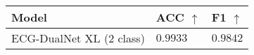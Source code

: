 \begin{tabular}{>{\raggedright\arraybackslash}p{}>{\raggedright\arraybackslash}p{}>{\raggedright\arraybackslash}p{}}
    \hline
	Model & ACC $\uparrow$ & F1 $\uparrow$ \\
	\hline
	ECG-DualNet XL ($2$ class) & $0.9933$ & $0.9842$ \\
	\hline
\end{tabular}
